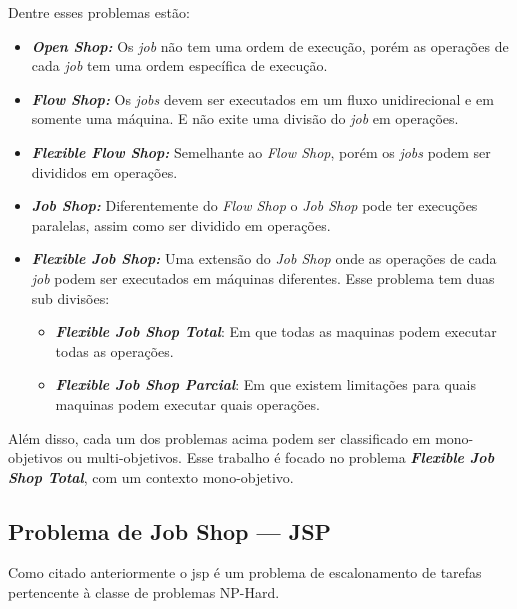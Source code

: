 \noindent Dentre esses problemas estão:
\begin{itemize}
    \item \textbf{\textit{Open Shop:}} Os \textit{job} não tem uma ordem de execução, porém as operações de cada \textit{job} tem uma ordem específica de execução.
    
    \item \textbf{\textit{Flow Shop:}} Os \textit{jobs} devem ser executados em um fluxo unidirecional e em somente uma máquina. E não exite uma divisão do \textit{job} em operações.
    
    \item \textbf{\textit{Flexible Flow Shop:}} Semelhante ao \textit{Flow Shop}, porém os \textit{jobs} podem ser divididos em operações.
    
    \item \textbf{\textit{Job Shop:}} Diferentemente do \textit{Flow Shop} o \textit{Job Shop} pode ter execuções paralelas, assim como ser dividido em operações.
    
    \item \textbf{\textit{Flexible Job Shop:}} Uma extensão do \textit{Job Shop} onde as operações de cada \textit{job} podem ser executados em máquinas diferentes. Esse problema tem duas sub divisões:
    \begin{itemize}
    \item \textbf{\textit{Flexible Job Shop Total}}: Em que todas as maquinas podem executar todas as operações. 
    \item \textbf{\textit{Flexible Job Shop Parcial}}: Em que existem limitações para quais maquinas podem executar quais operações.
    \end{itemize}
\end{itemize}
\noindent Além disso, cada um dos problemas acima podem ser classificado em mono-objetivos ou multi-objetivos. Esse trabalho é focado no problema \textbf{\textit{Flexible Job Shop Total}}, com um contexto mono-objetivo.
\subsection{Problema de Job Shop — JSP}
Como citado anteriormente o \gls{jsp} é um problema de escalonamento de tarefas pertencente à classe de problemas NP-Hard.


